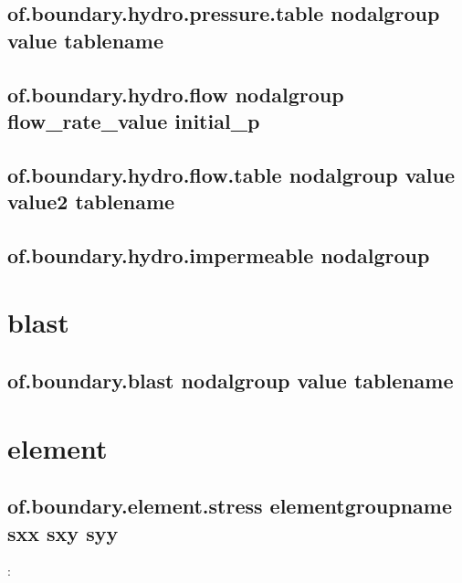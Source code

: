 \documentclass[letterpaper,10pt,english]{sphinxmanual}
\begin{document}
\subsection{of.boundary.hydro.pressure.table nodalgroup value tablename}
\label{\detokenize{rst_tutorials/command_line_guide:of-boundary-hydro-pressure-table-nodalgroup-value-tablename}}

\subsection{of.boundary.hydro.flow nodalgroup flow\_rate\_value initial\_p}
\label{\detokenize{rst_tutorials/command_line_guide:of-boundary-hydro-flow-nodalgroup-flow-rate-value-initial-p}}

\subsection{of.boundary.hydro.flow.table nodalgroup value value2 tablename}
\label{\detokenize{rst_tutorials/command_line_guide:of-boundary-hydro-flow-table-nodalgroup-value-value2-tablename}}

\subsection{of.boundary.hydro.impermeable nodalgroup}
\label{\detokenize{rst_tutorials/command_line_guide:of-boundary-hydro-impermeable-nodalgroup}}

\section{blast}
\label{\detokenize{rst_tutorials/command_line_guide:blast}}

\subsection{of.boundary.blast nodalgroup value tablename}
\label{\detokenize{rst_tutorials/command_line_guide:of-boundary-blast-nodalgroup-value-tablename}}

\section{element}
\label{\detokenize{rst_tutorials/command_line_guide:id4}}

\subsection{of.boundary.element.stress elementgroupname sxx sxy syy}
\label{\detokenize{rst_tutorials/command_line_guide:of-boundary-element-stress-elementgroupname-sxx-sxy-syy}}
:
\end{document}
